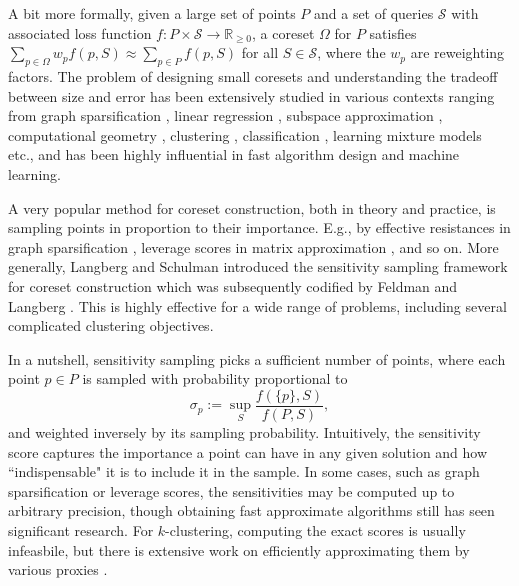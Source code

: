 \documentclass[11pt]{article}
\theoremstyle{restate}
\theoremstyle{definition}
\begin{document}
A bit more formally, given a large set of points $P$ and a set of queries $\mathcal{S}$ with associated loss function $f:P\times \mathcal{S}\rightarrow \mathbb{R}_{\geq 0}$, a coreset $\Omega$ for $P$ satisfies $\sum_{p\in \Omega} w_p f(p,S)\approx \sum_{p\in P}f(p,S)$ for all $S\in \mathcal{S}$, where the $w_p$ are reweighting factors. 
The problem of designing small coresets and understanding the tradeoff between size and error has been extensively studied in various contexts ranging from graph sparsification \cite{SpielmanS11, BatsonSS12}, linear regression \cite{DasguptaDHKM09}, subspace approximation \cite{WoodruffY23}, computational geometry \cite{AHV04}, clustering \cite{HaM04}, classification \cite{MaiMR21}, learning mixture models \cite{LucicFKF17} etc., and has been highly influential in fast algorithm design and  machine learning.



A very popular method for coreset construction, both in theory and practice, is sampling points in proportion to their importance. E.g., by effective resistances in graph sparsification \cite{SpielmanS11}, leverage scores in matrix approximation \cite{DrineasMMW12}, and so on.
More generally, Langberg and Schulman \cite{LS10} introduced the 
sensitivity sampling framework for coreset construction which was subsequently codified by Feldman and Langberg \cite{FL11}. This is highly effective for a wide range of problems, including several complicated clustering objectives.

In a nutshell, sensitivity sampling picks a sufficient number of points, where each point $p\in P$ is sampled with probability proportional to 
\[\sigma_p := \sup_{S} \frac{f(\{p\},S)}{f(P,S)},\]
and weighted inversely by its sampling probability. Intuitively, the sensitivity score captures the importance a point can have in any given solution and how ``indispensable" it is to include it in the sample.
In some cases, such as graph sparsification or leverage scores, the sensitivities may be computed up to arbitrary precision, though obtaining fast approximate algorithms still has seen significant research. For $k$-clustering, computing the exact scores is usually infeasbile, but there is extensive work on efficiently approximating them by various proxies \cite{BachemLL18,FL11,FeldmanSS20}.
\end{document}
